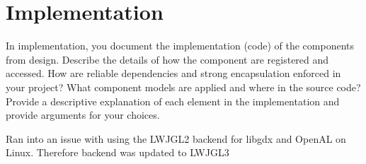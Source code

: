 \section{Implementation}
In implementation, you document the implementation (code) of the components from
design.
Describe the details of how the component are registered and accessed.
How are reliable dependencies and strong encapsulation enforced in your project?
What component models are applied and where in the source code?
Provide a descriptive explanation of each element in the implementation and 
provide arguments for your choices.

Ran into an issue with using the LWJGL2 backend for libgdx and OpenAL on Linux. 
Therefore backend was updated to LWJGL3